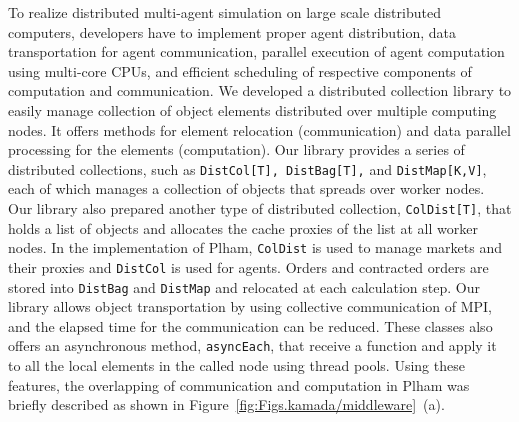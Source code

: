 To realize distributed multi-agent simulation on large scale distributed computers,
developers have to implement proper agent distribution, data transportation for agent communication, parallel execution of agent computation using multi-core CPUs, and efficient scheduling of respective components of computation and communication.
We developed a distributed collection library to easily manage
collection of object elements distributed over multiple computing nodes.
It offers methods for element relocation (communication) and data parallel processing for the elements (computation).
Our library provides a series of distributed collections, such as \texttt{DistCol[T], DistBag[T],} and
\texttt{DistMap[K,V]}, each of which manages a collection of objects that spreads over worker nodes.
Our library also prepared another type of distributed collection, \texttt{ColDist[T]}, that holds a list of objects
and allocates the cache proxies of the list at all worker nodes.
In the implementation of Plham, \texttt{ColDist} is used to manage markets and their proxies and
\texttt{DistCol} is used for agents.
Orders and contracted orders are stored into \texttt{DistBag} and \texttt{DistMap} and relocated at each calculation step.
Our library allows object transportation by using collective communication of MPI,
and the elapsed time for the communication can be reduced.
These classes also offers an asynchronous method,
\texttt{asyncEach},
that receive a function and apply it to all the local elements in the called node using thread pools.
Using these features, the overlapping of communication and computation in Plham was briefly described as shown in Figure~\ref{fig:Figs.kamada/middleware}~(a).

